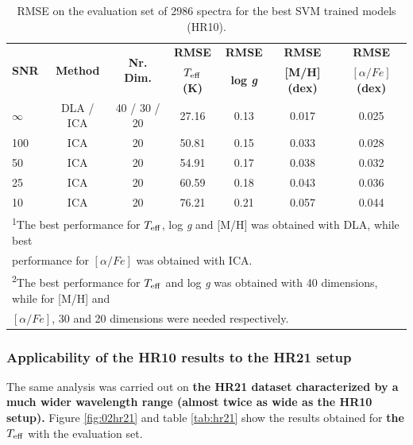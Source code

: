 \documentclass[a4paper,fleqn,usenatbib]{mnras}
\begin{document}
{{{\begin{table}
\centering
\caption{RMSE on the evaluation set of 2986 spectra for the best SVM trained models (HR10).}
\label{tab:01}
\begin{tabular}{l c c c c c c}
\hline
\multirow{2}{*}{\textbf{SNR}} & \multirow{2}{*}{\textbf{Method}} & \multirow{2}{*}{\textbf{Nr. Dim.}} & {\bf RMSE} & {\bf RMSE} & {\bf RMSE} & {\bf RMSE}\\
 &  &  & \textbf{$T_{\rm eff}$ (K)} & \textbf{log \textit{g}} & \textbf{[M/H] (dex)}  & \textbf{$\left[ \alpha/Fe \right]$ (dex)}\\
\hline
$\infty$ & DLA / ICA\protect\footnotemark[1] & 40 / 30 / 20\protect\footnotemark[2] & 27.16 & 0.13 & 0.017 & 0.025\\
100 & ICA & 20 & 50.81 & 0.15 & 0.033 & 0.028\\
50 & ICA & 20 & 54.91 & 0.17 & 0.038 & 0.032\\
25 & ICA & 20 & 60.59 & 0.18 & 0.043 & 0.036\\
10 & ICA & 20 & 76.21 & 0.21 & 0.057 & 0.044\\
\hline
\multicolumn{7}{l}{\textsuperscript{1}\footnotesize{The best performance for $T_{\rm eff}$, log 
		\textit{g} and [M/H] was obtained with DLA,  while best}}\\
\multicolumn{7}{l}{\footnotesize{performance for $\left[ \alpha/Fe \right]$ was obtained with ICA.}}\\
\multicolumn{7}{l}{\textsuperscript{2}\footnotesize{The best performance for $T_{\rm eff}$ and log 
		\textit{g} was obtained with 40 dimensions, while for [M/H] and}}\\ 
		\multicolumn{7}{l}{\footnotesize{ 
		$\left[ \alpha/Fe \right]$, 30 and 20 dimensions were needed respectively.}}
\end{tabular}
\end{table}

\subsubsection{Applicability of the HR10 results to the HR21 setup}
The same analysis was carried out on {\bf the HR21 dataset characterized by  
a much wider wavelength range (almost twice as wide as the HR10 setup). }
Figure \ref{fig:02hr21} and table \ref{tab:hr21} show the results 
obtained for {\bf the} $T_{\rm eff}$ with the evaluation set.

}}}
\end{document}
